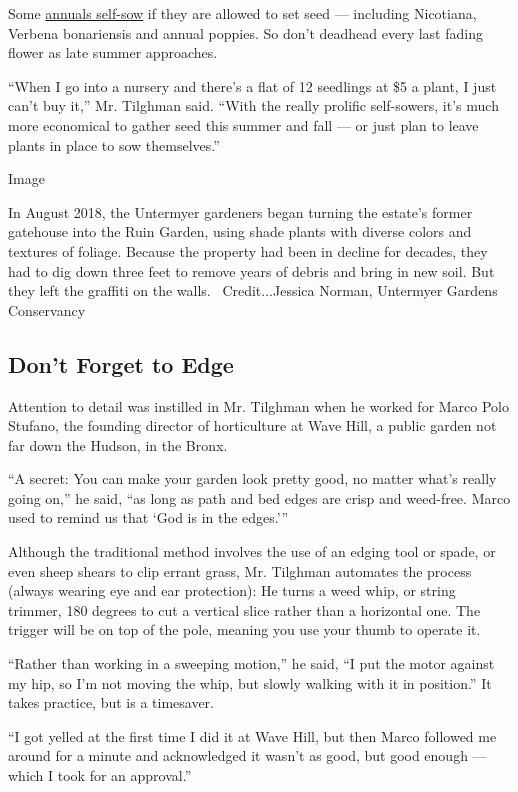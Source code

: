 Some
\href{https://www.nytimes.com/2020/04/28/realestate/shopping-your-garden-plants-flowers.html?/}{annuals
self-sow} if they are allowed to set seed --- including Nicotiana,
Verbena bonariensis and annual poppies. So don't deadhead every last
fading flower as late summer approaches.

``When I go into a nursery and there's a flat of 12 seedlings at \$5 a
plant, I just can't buy it,'' Mr. Tilghman said. ``With the really
prolific self-sowers, it's much more economical to gather seed this
summer and fall --- or just plan to leave plants in place to sow
themselves.''

Image

In August 2018, the Untermyer gardeners began turning the estate's
former gatehouse into the Ruin Garden, using shade plants with diverse
colors and textures of foliage. Because the property had been in decline
for decades, they had to dig down three feet to remove years of debris
and bring in new soil. But they left the graffiti on the walls.
~Credit...Jessica Norman, Untermyer Gardens Conservancy

\hypertarget{dont-forget-to-edge}{%
\subsection{Don't Forget to Edge}\label{dont-forget-to-edge}}

Attention to detail was instilled in Mr. Tilghman when he worked for
Marco Polo Stufano, the founding director of horticulture at Wave Hill,
a public garden not far down the Hudson, in the Bronx.

``A secret: You can make your garden look pretty good, no matter what's
really going on,'' he said, ``as long as path and bed edges are crisp
and weed-free. Marco used to remind us that `God is in the edges.'''

Although the traditional method involves the use of an edging tool or
spade, or even sheep shears to clip errant grass, Mr. Tilghman automates
the process (always wearing eye and ear protection): He turns a weed
whip, or string trimmer, 180 degrees to cut a vertical slice rather than
a horizontal one. The trigger will be on top of the pole, meaning you
use your thumb to operate it.

``Rather than working in a sweeping motion,'' he said, ``I put the motor
against my hip, so I'm not moving the whip, but slowly walking with it
in position.'' It takes practice, but is a timesaver.

``I got yelled at the first time I did it at Wave Hill, but then Marco
followed me around for a minute and acknowledged it wasn't as good, but
good enough --- which I took for an approval.''

